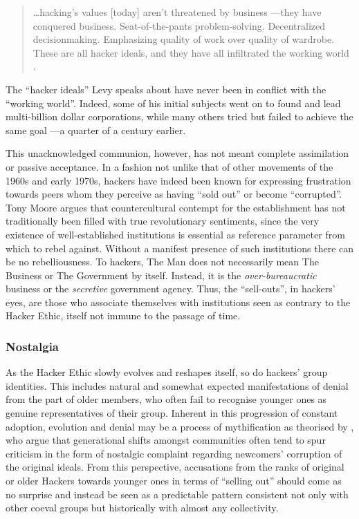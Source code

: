\begin{quote}
\dots hacking's values [today] aren't threatened by business ---they have conquered business. Seat-of-the-pants problem-solving. Decentralized decisionmaking. Emphasizing quality of work over quality of wardrobe. These are all hacker ideals, and they have all infiltrated the working world \citep{levy10}.
\end{quote}

The ``hacker ideals'' Levy speaks about have never been in conflict with the ``working world''. Indeed, some of his initial subjects went on to found and lead multi-billion dollar corporations, while many others tried but failed to achieve the same goal ---a quarter of a century earlier. 

This unacknowledged communion, however, has not meant complete assimilation or passive acceptance. In a fashion not unlike that of other movements of the 1960s and early 1970s, hackers have indeed been known for expressing frustration towards peers whom they perceive as having ``sold out'' or become ``corrupted''. Tony Moore argues that countercultural contempt for the establishment has not traditionally been filled with true revolutionary sentiments, since the very existence of well-established institutions is essential as reference parameter from which to rebel against. Without a manifest presence of such institutions there can be no rebelliousness. To hackers, The Man does not necessarily mean The Business or The Government by itself. Instead, it is the \emph{over-bureaucratic} business or the \emph{secretive} government agency. Thus, the ``sell-outs'', in hackers' eyes, are those who associate themselves with institutions seen as contrary to the Hacker Ethic, itself not  immune to the passage of time.


\subsubsection{Nostalgia}

As the Hacker Ethic slowly evolves and reshapes itself, so do hackers' group identities. This includes natural and somewhat expected manifestations of denial from the part of older members, who often fail to recognise younger ones as genuine representatives of their group. Inherent in this progression of constant adoption, evolution and denial may be a process of mythification as theorised by \citet{lave91}, who argue that generational shifts amongst communities often tend to spur criticism in the form of nostalgic complaint regarding newcomers' corruption of the original ideals. From this perspective, accusations from the ranks of original or older Hackers towards younger ones in terms of ``selling out'' should come as no surprise and instead be seen as a predictable pattern consistent not only with other coeval groups but historically with almost any collectivity.

